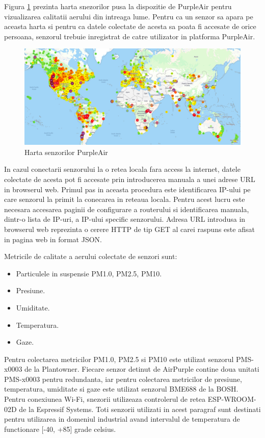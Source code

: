 Figura \ref{fig:sb_purpleairmap} prezinta harta snezorilor pusa la dispozitie de PurpleAir pentru vizualizarea calitatii aerului din intreaga lume. Pentru 
ca un senzor sa apara pe aceasta harta si pentru ca datele colectate de acesta sa poata fi accesate de orice persoana, senzorul trebuie inregistrat de catre 
utilizator in platforma PurpleAir. 
\begin{figure}[H]
    \centering
    \includegraphics[scale=0.35]{figs/sb_purpleairmap.png}
    \caption{Harta senzorilor PurpleAir}
    \label{fig:sb_purpleairmap}
\end{figure}

In cazul conectarii senzorului la o retea locala fara access la internet, datele colectate de acesta pot fi accesate prin introducerea manuala a unei adrese 
URL in browserul web. Primul pas in aceasta procedura este identificarea IP-ului pe care senzorul la primit la conecarea in reteaua locala. Pentru acest lucru 
este necesara accesarea paginii de configurare a routerului si identificarea manuala, dintr-o lista de IP-uri, a IP-ului specific senzorului. Adresa URL 
introdusa in browserul web reprezinta o cerere HTTP de tip GET al carei raspuns este afisat in pagina web in format JSON.

Metricile de calitate a aerului colectate de senzori sunt:
\begin{itemize}
	\item Particulele in suspensie PM1.0, PM2.5, PM10.
	\item Presiune.
	\item Umiditate.
	\item Temperatura.
	\item Gaze.
\end{itemize}
Pentru colectarea metricilor PM1.0, PM2.5 si PM10 este utilizat senzorul PMS-x0003 de la Plantowner. Fiecare senzor detinut de AirPurple contine doua 
unitati PMS-x0003 pentru redundanta, iar pentru colectarea metricilor de presiune, temperatura, umiditate si gaze este utilizat senzorul BME688 de la BOSH. Pentru 
conexiunea Wi-Fi, snezorii utilizeaza controlerul de retea ESP-WROOM-02D de la Espressif Systems. Toti senzorii utilizati in acest paragraf sunt destinati pentru 
utilizarea in domeniul industrial avand intervalul de temperatura de functionare [-40, +85] grade celsius.

